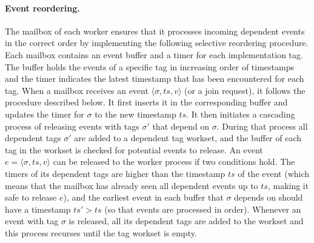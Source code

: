 \paragraph{Event reordering.}
The mailbox of each worker ensures that it processes incoming
dependent events in the correct order by implementing the following
selective reordering procedure. Each mailbox contains an event buffer
and a timer for each implementation tag. The buffer holds the events
of a specific tag in increasing order of timestamps and the timer
indicates the latest timestamp that has been encountered for each tag.
When a mailbox receives an event $\langle \sigma, ts, v \rangle$ (or a
join request), it follows the procedure described below. It first
inserts it in the corresponding buffer and updates the timer for
$\sigma$ to the new timestamp $ts$. It then initiates a
cascading process of releasing events with tags $\sigma'$ that depend
on $\sigma$. During that process all dependent tags $\sigma'$ are
added to a dependent tag workset, and the buffer of each tag in the
workset is checked for potential events to release. An event $e =
\langle \sigma, ts, v \rangle$ can be released to the worker process
if two conditions hold. The timers of its dependent tags are higher
than the timestamp $ts$ of the event (which means that the mailbox has
already seen all dependent events up to $ts$, making it safe to
release $e$), and the earliest event in each buffer that $\sigma$
depends on should have a timestamp $ts' > ts$ (so that events are
processed in order). Whenever an event with tag $\sigma$ is released,
all its dependent tags are added to the workset and this process
recurses until the tag workset is empty.

